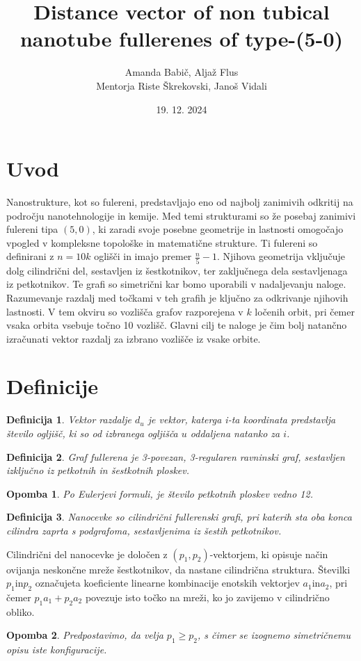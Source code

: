 \documentclass[a4paper, 12pt]{article}
\title{
    Distance vector of non tubical nanotube fullerenes of type-(5-0)
}
\author{Amanda Babič, Aljaž Flus \\
        {\small Mentorja Riste Škrekovski, Janoš Vidali}}
\date{19. 12. 2024}
\newtheorem{definicija}{Definicija}[section]
\newtheorem{opomba}{Opomba}[section]
\begin{document}
\maketitle

\section{Uvod}

Nanostrukture, kot so fulereni, predstavljajo eno od najbolj zanimivih odkritij na področju nanotehnologije in kemije. Med temi strukturami so že posebaj zanimivi
fulereni tipa $(5,0)$, ki zaradi svoje posebne geometrije in lastnosti omogočajo vpogled v kompleksne topološke in matematične strukture.
Ti fulereni so definirani z $n=10k$ oglišči in imajo premer  $\frac{n}{5}-1$. Njihova geometrija vključuje dolg cilindrični del, sestavljen iz šestkotnikov, ter zaključnega dela sestavljenaga iz petkotnikov.
Te grafi so simetrični kar bomo uporabili v nadaljevanju naloge. Razumevanje razdalj med točkami v teh grafih je ključno za odkrivanje njihovih lastnosti. V tem okviru so vozlišča grafov razporejena v $k$
ločenih orbit, pri čemer vsaka orbita vsebuje točno 10 vozlišč. Glavni cilj te naloge je čim bolj natančno izračunati vektor razdalj za izbrano vozlišče iz vsake orbite.

\section{Definicije}

\begin{definicija}
    Vektor razdalje $d_{u}$ je vektor, katerga i-ta koordinata predstavlja število ogljišč, ki so od izbranega ogljišča $u$ oddaljena natanko za $i$. 
\end{definicija}

\begin{definicija}
    Graf fullerena je 3-povezan, 3-regularen ravninski graf, sestavljen izključno iz petkotnih in šestkotnih ploskev.
\end{definicija}

\begin{opomba}
    Po Eulerjevi formuli, je število petkotnih ploskev vedno 12.
\end{opomba}

\begin{definicija}
    Nanocevke so cilindrični fullerenski grafi, pri katerih sta oba konca cilindra zaprta s podgrafoma, sestavljenima iz šestih petkotnikov.
\end{definicija}

Cilindrični del nanocevke je določen z $(p_1, p_2)$-vektorjem, ki opisuje način ovijanja neskončne mreže šestkotnikov, da nastane cilindrična struktura.
Številki $p_1 \text{in} p_2$ označujeta koeficiente linearne kombinacije enotskih vektorjev $a_1 \text{in} a_2$, pri čemer $p_1a_1 + p_2a_2$ povezuje
isto točko na mreži, ko jo zavijemo v cilindrično obliko.
    
\begin{opomba}
    Predpostavimo, da velja $p_1 \ge p_2$, s čimer se izognemo simetričnemu opisu iste konfiguracije.
\end{opomba}
\end{document}
